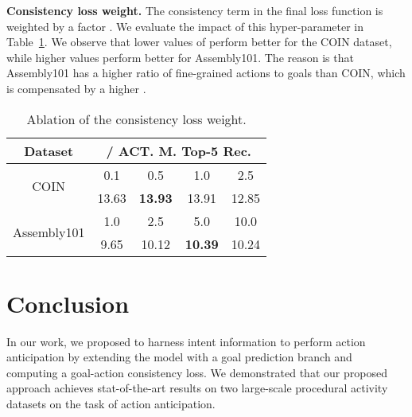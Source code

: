 \documentclass{article}
\begin{document}
\textbf{Consistency loss weight.} The consistency term in the final loss function is weighted by a factor . We evaluate the impact of this hyper-parameter in Table~\ref{tab:abl_lambda}. We observe that lower values of  perform better for the COIN dataset, while higher values perform better for Assembly101. The reason is that Assembly101 has a higher ratio of fine-grained actions to goals than COIN, which is compensated by a higher .        






\begin{table}[h!]
    \centering
    \scriptsize
    \begin{tabular}{|c|c|c|c|c|}
        \hline
        {Dataset}& \multicolumn{4}{c|}{ / ACT. M. Top-5 Rec.} \\
        \hline
        \multirow{2}{*}{COIN} & 0.1 & 0.5 & 1.0 & 2.5 \\
        \cline{2-5}
        & 13.63 & \textbf{13.93} & 13.91 & 12.85  \\
        \hline
        \hline
        \multirow{2}{*}{Assembly101} & 1.0 & 2.5 & 5.0 & 10.0 \\
        \cline{2-5}
        & 9.65 & 10.12 & \textbf{10.39} & 10.24 \\
        \hline
    \end{tabular}
    \caption{\small Ablation of the consistency loss weight.}
    \label{tab:abl_lambda}
    \vspace{-0.5cm}
\end{table}

\section{Conclusion}
\label{sec:conclusion}
\vspace{-0.1cm}
In our work, we proposed to harness intent information to perform action anticipation by extending the model with a goal prediction branch and computing a goal-action consistency loss. We demonstrated that our proposed approach achieves stat-of-the-art results on two large-scale procedural activity datasets on the task of action anticipation.

\newpage


\end{document}

